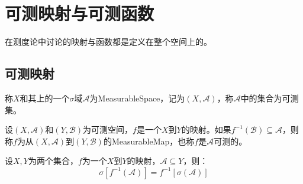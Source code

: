 \section{可测映射与可测函数}
\begin{note}
	在测度论中讨论的映射与函数都是定义在整个空间上的。
\end{note}
\subsection{可测映射}
\begin{definition}
	称$X$和其上的一个$\sigma$域$\mathscr{A}$为\gls{MeasurableSpace}，记为$(X,\mathscr{A})$，称$\mathscr{A}$中的集合为可测集。
\end{definition}
\begin{definition}
	设$(X,\mathscr{A})$和$(Y,\mathscr{B})$为可测空间，$f$是一个$X$到$Y$的映射。如果$f^{-1}(\mathscr{B})\subseteq\mathscr{A}$，则称$f$为从$(X,\mathscr{A})$到$(Y,\mathscr{B})$的\gls{MeasurableMap}，也称$f$是$\mathscr{A}$可测的。
\end{definition}
\begin{lemma}\label{lem:PreimageSigmaField}
	设$X,Y$为两个集合，$f$为一个$X$到$Y$的映射，$\mathscr{A}\subseteq Y$，则：
	\begin{equation*}
		\sigma[f^{-1}(\mathscr{A})]=f^{-1}[\sigma(\mathscr{A})]
	\end{equation*}
\end{lemma}
